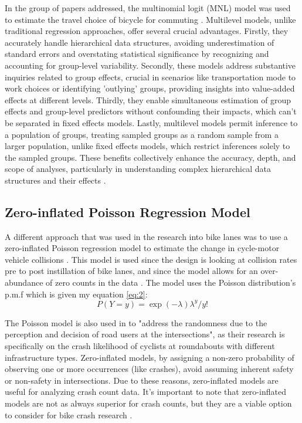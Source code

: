 \documentclass[12pt, letterpaper]{article}
\begin{document}
In the group of papers addressed, the multinomial logit (MNL) model was used to estimate the travel choice of bicycle for commuting \cite{10Zhao2013}. Multilevel models, unlike traditional regression approaches, offer several crucial advantages. Firstly, they accurately handle hierarchical data structures, avoiding underestimation of standard errors and overstating statistical significance by recognizing and accounting for group-level variability. Secondly, these models address substantive inquiries related to group effects, crucial in scenarios like transportation mode to work choices or identifying 'outlying' groups, providing insights into value-added effects at different levels. Thirdly, they enable simultaneous estimation of group effects and group-level predictors without confounding their impacts, which can't be separated in fixed effects models. Lastly, multilevel models permit inference to a population of groups, treating sampled groups as a random sample from a larger population, unlike fixed effects models, which restrict inferences solely to the sampled groups. These benefits collectively enhance the accuracy, depth, and scope of analyses, particularly in understanding complex hierarchical data structures and their effects \cite{Rasbash_2023}.

\subsection{Zero-inflated Poisson Regression Model}
\label{sec:pois}

A different approach that was used in the research into bike lanes was to use a zero-inflated Poisson regression model to estimate the change in cycle-motor vehicle collisions \cite{8Bhatia2016}. This model is used since the design is looking at collision rates pre to post instillation of bike lanes, and since the model allows for an over-abundance of zero counts in the data \cite{Giles2010}. The model uses the Poisson distribution's p.m.f which is given my equation \ref{eq:2}:
\begin{equation} \label{eq:2}
P(Y=y) = \exp{(-\lambda)\lambda^{y}}/y!
\end{equation}


The Poisson model is also used in \citet{9Cantisani2021} to "address the randomness due to the perception and decision of road users at the intersections", as their research is specifically on the crash likelihood of cyclists at roundabouts with different infrastructure types. Zero-inflated models, by assigning a non-zero probability of observing one or more occurrences (like crashes), avoid assuming inherent safety or non-safety in intersections. Due to these reasons, zero-inflated models are useful for analyzing crash count data. It's important to note that zero-inflated models are not as always superior for crash counts, but they are a viable option to consider for bike crash research \cite{Pew_Warr_Schultz_Heaton_2020}. 
\end{document}
